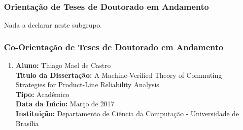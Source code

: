 \documentclass[a4paper,oneside,10pt]{article}
\begin{document}

\subsubsection{Orienta\c{c}\~{a}o de Teses de Doutorado em Andamento}
\vspace{0.3cm}

Nada a declarar neste subgrupo.
%
%


\subsubsection{Co-Orienta\c{c}\~{a}o de Teses de Doutorado em Andamento}
\vspace{0.3cm}

\begin{enumerate}
\renewcommand{\labelenumi}{{\large\bfseries\arabic{enumi}.}}

\item       \textbf{Aluno:} Thiago Mael de Castro \mbox{}\\
            \textbf{T\'{\i}tulo da Disserta\c{c}\~{a}o:} A Machine-Verified Theory of Commuting Strategies for Product-Line Reliability Analysis\\
            \textbf{Tipo:} Acadêmico \\%
            \textbf{Data da In\'{\i}cio:} Março de 2017\\
            \textbf{Institui\c{c}\~{a}o:} Departamento de Ciência da Computação - Universidade de Brasília
\end{enumerate}
\end{document}
